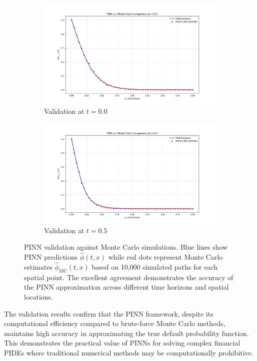\documentclass[11pt,twoside,openright]{report}
\begin{document}
\begin{figure}[htbp]
    \centering
    \begin{subfigure}[b]{0.8\textwidth}
        \includegraphics[width=\textwidth]{Figures/pinn_vs_mc_t0.png}
        \caption{Validation at $t = 0.0$}
    \end{subfigure}
    \hfill
    \begin{subfigure}[b]{0.8\textwidth}
        \includegraphics[width=\textwidth]{Figures/pinn_vs_mc_t05.png}
        \caption{Validation at $t = 0.5$}
    \end{subfigure}
    \caption{PINN validation against Monte Carlo simulations. Blue lines show PINN predictions $\hat{\phi}(t,x)$ while red dots represent Monte Carlo estimates $\hat{\phi}_{\text{MC}}(t,x)$ based on 10,000 simulated paths for each spatial point. The excellent agreement demonstrates the accuracy of the PINN approximation across different time horizons and spatial locations.}
    \label{fig:pinn_mc_comparison}
\end{figure}

The validation results confirm that the PINN framework, despite its computational efficiency compared to brute-force Monte Carlo methods, maintains high accuracy in approximating the true default probability function. This demonstrates the practical value of PINNs for solving complex financial PIDEs where traditional numerical methods may be computationally prohibitive.
\end{document}
